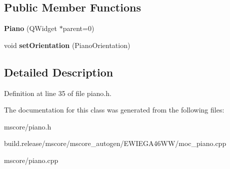 \subsection*{Public Member Functions}
\begin{DoxyCompactItemize}
\item 
\mbox{\label{class_ms_1_1_piano_afb87e02d9e510fdc991ce6d59186435c}} 
{\bfseries Piano} (Q\+Widget $\ast$parent=0)
\item 
\mbox{\label{class_ms_1_1_piano_a3bff111dcd541d2444b8898fc869a097}} 
void {\bfseries set\+Orientation} (Piano\+Orientation)
\end{DoxyCompactItemize}


\subsection{Detailed Description}


Definition at line 35 of file piano.\+h.



The documentation for this class was generated from the following files\+:\begin{DoxyCompactItemize}
\item 
mscore/piano.\+h\item 
build.\+release/mscore/mscore\+\_\+autogen/\+E\+W\+I\+E\+G\+A46\+W\+W/moc\+\_\+piano.\+cpp\item 
mscore/piano.\+cpp\end{DoxyCompactItemize}
